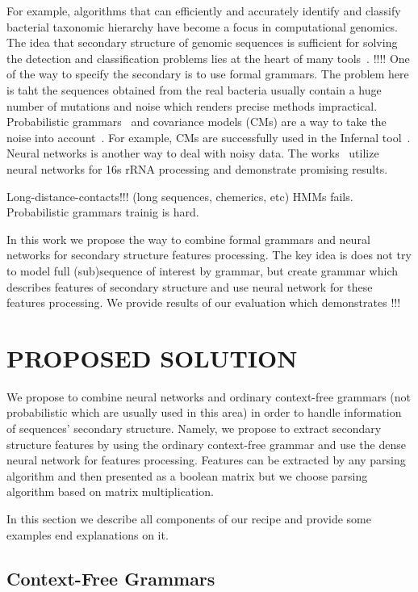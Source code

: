 \documentclass[a4paper,twoside]{article}
\begin{document}
For example, algorithms that can efficiently and accurately identify and classify bacterial taxonomic hierarchy have become a focus in computational genomics.
The idea that secondary structure of genomic sequences is sufficient for solving the detection and classification problems lies at the heart of many tools~\cite{GrammarsRNA,PCFG,meta,LWPCFG}. !!!!
One of the way to specify the secondary is to use formal grammars. 
The problem here is taht the sequences obtained from the real bacteria usually contain a huge number of mutations and noise which renders precise methods impractical. 
Probabilistic grammars~\cite{!!!} and covariance models (CMs) are a way to take the noise into account~\cite{EddyDurbin}.
For example, CMs are successfully used in the Infernal tool~\cite{Infernal}.
Neural networks is another way to deal with noisy data. 
The works~\cite{Humidor,ANN} utilize neural networks for 16s rRNA processing and demonstrate promising results.

Long-distance-contacts!!! (long sequences, chemerics, etc)
HMMs fails. 
Probabilistic grammars trainig is hard.

In this work we propose the way to combine formal grammars and neural networks for secondary structure features processing.
The key idea is does not try to model full (sub)sequence of interest by grammar, but create grammar which describes features of secondary structure and use neural network for these features processing.
We provide results of our evaluation which demonstrates !!!

\section{\uppercase{Proposed solution}}
\label{sec:proposedSolution}

\noindent We propose to combine neural networks and ordinary context-free grammars (not probabilistic which are usually used in this area) in order to handle information of sequences' secondary structure. 
Namely, we propose to extract secondary structure features by using the ordinary context-free grammar and use the dense neural network for features processing.
Features can be extracted by any parsing algorithm and then presented as a boolean matrix but we choose parsing algorithm based on matrix multiplication.

In this section we describe all components of our recipe and provide some examples end explanations on it.
 
\subsection{Context-Free Grammars}
\end{document}
